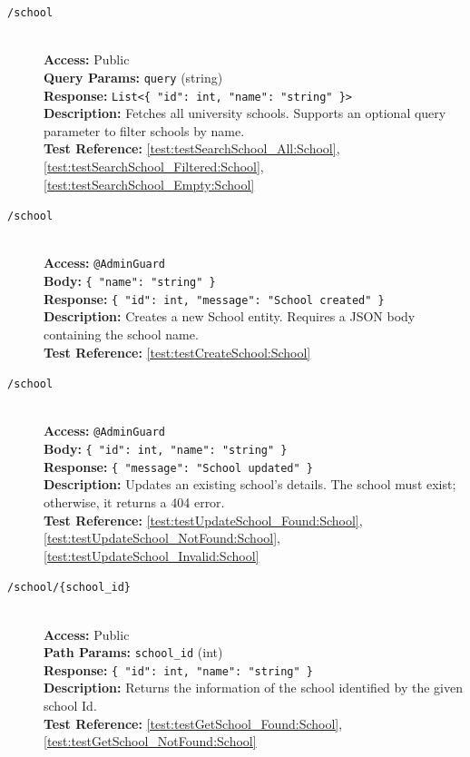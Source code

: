 \begin{description}
	\item[\GET \quad \texttt{/school}] \hfill \\
	\textbf{Access:} Public \\
	\textbf{Query Params:} \texttt{query} (string) \\
	\textbf{Response:} \texttt{List<\{ "id": int, "name": "string" \}>} \\
	\textbf{Description:} Fetches all university schools. Supports an optional query parameter to filter schools by name.\\
	\textbf{Test Reference:} \ref{test:testSearchSchool_All:School}, \ref{test:testSearchSchool_Filtered:School}, \ref{test:testSearchSchool_Empty:School}
	
	\item[\POST \quad \texttt{/school}] \hfill \\
	\textbf{Access:} \texttt{@AdminGuard} \\
	\textbf{Body:} \texttt{\{ "name": "string" \}} \\
	\textbf{Response:} \texttt{\{ "id": int, "message": "School created" \}} \\
	\textbf{Description:} Creates a new School entity. Requires a JSON body containing the school name.\\
	\textbf{Test Reference:} \ref{test:testCreateSchool:School}
	
	\item[\PUT \quad \texttt{/school}] \hfill \\
	\textbf{Access:} \texttt{@AdminGuard} \\
	\textbf{Body:} \texttt{\{ "id": int, "name": "string" \}} \\
	\textbf{Response:} \texttt{\{ "message": "School updated" \}} \\
	\textbf{Description:} Updates an existing school's details. The school must exist; otherwise, it returns a 404 error.\\
	\textbf{Test Reference:} \ref{test:testUpdateSchool_Found:School}, \ref{test:testUpdateSchool_NotFound:School}, \ref{test:testUpdateSchool_Invalid:School}
	
	\item[\GET \quad \texttt{/school/\{school\_id\}}] \hfill \\
	\textbf{Access:} Public \\
	\textbf{Path Params:} \texttt{school\_id} (int) \\
	\textbf{Response:} \texttt{\{ "id": int, "name": "string" \}} \\
	\textbf{Description:} Returns the information of the school identified by the given school Id.\\
	\textbf{Test Reference:} \ref{test:testGetSchool_Found:School}, \ref{test:testGetSchool_NotFound:School}
	

\end{description}
